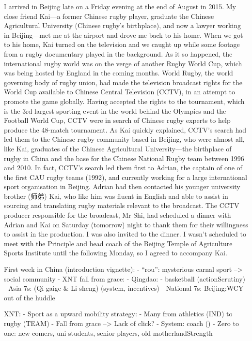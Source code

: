 I arrived in Beijing late on a Friday evening at the end of August in 2015.  My close friend Kai---a former Chinese rugby player, graduate the Chinese Agricultural University (Chinese rugby's birthplace), and now a lawyer working in Beijing---met me at the airport and drove me back to his home.  When we got to his home, Kai turned on the television and we caught up while some footage from a rugby documentary played in the background.  As it so happened, the international rugby world was on the verge of another Rugby World Cup, which was being hosted by England in the coming months. World Rugby, the world governing body of rugby union, had made the television broadcast rights for the World Cup available to Chinese Central Television (CCTV), in an attempt to promote the game globally.  Having accepted the rights to the tournament, which is the 3rd largest sporting event in the world behind the Olympics and the Football World Cup, CCTV were in search of Chinese rugby experts to help produce the 48-match tournament.  As Kai quickly explained, CCTV's search had led them to the Chinese rugby community based in Beijing, who were almost all, like Kai, graduates of the Chinese Agricultural University---the birthplace of rugby in China and the base for the Chinese National Rugby team between 1996 and 2010.  In fact, CCTV's search led them first to Adrian, the captain of one of the first CAU rugby teams (1992), and currently working for a large international sport organisation in Beijing.  Adrian had then contacted his younger university brother (师弟) Kai, who like him was fluent in English and able to assist in sourcing and translating rugby materials relevant to the broadcast. The CCTV producer responsible for the broadcast, Mr Shi, had scheduled a dinner with Adrian and Kai on Saturday (tomorrow) night to thank them for their willingness to assist in the production.  I was also invited to the dinner. I wasn't scheduled to meet with the Principle and head coach of the Beijing Temple of Agriculture Sports Institute until the following Monday, so I agreed to accompany Kai.







First week in China (introduction vignette):
- ``rou'': mysterious carnal sport --> social community
- XNT fall from grace:
- Qingdao:
    - basketball (actionScrutiny)
    - Asia 7s: (Qi gaige & Li sheng) (system, incentives)
    - National 7s: Beijing:WCY out of the huddle


XNT:
- Sport as a upward mobility strategy:
    - Many from athletics (IND) to rugby (TEAM)
- Fall from grace --> Lack of click?
- System: coach ()
- Zero to one: new comers, uni students, senior players, old motherlandStrength

